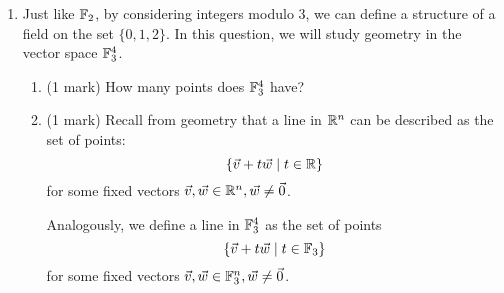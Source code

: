 \documentclass[12pt]{article}
\begin{document}
\begin{enumerate}
\item Just like $\mathbb{F}_2$, by considering integers modulo $3$, we can define a structure of a field on the set $\{0,1,2\}$. In this question, we will study geometry in the vector space $\mathbb{F}_3^4$.
  \begin{enumerate}
  \item (1 mark) How many points does $\mathbb{F}_3^4$ have?
  \item (1 mark) Recall from geometry that a line in $\mathbb{R}^n$ can be described as the set of points:
    \[
      \left\{ \vec v+t\vec w \; | \;  t\in \mathbb{R} \right\}
    \]
    for some fixed vectors $\vec v, \vec w\in \mathbb{R}^n, \vec w \neq \vec 0$.
    
    Analogously, we define a line in $\mathbb{F}_3^4$ as the set of points
    \[
      \left\{ \vec v+t\vec w \; | \;  t\in \mathbb{F}_3 \right\}
    \]
    for some fixed vectors $\vec v, \vec w\in \mathbb{F}_3^n, \vec w \neq \vec 0$.
    

\end{enumerate}
\end{enumerate}
\end{document}
